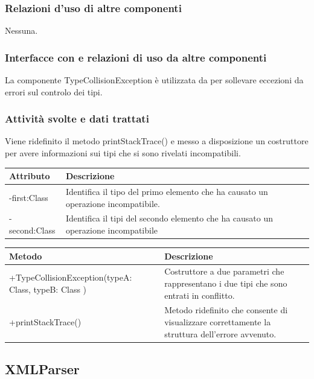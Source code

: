 \documentclass[11pt,titlepage,a4paper]{report}
\begin{document}
\subsubsection{Relazioni d'uso di altre componenti}
Nessuna.
\subsubsection{Interfacce con e relazioni di uso da altre componenti}
La componente TypeCollisionException \`e utilizzata da \brp per sollevare eccezioni da errori sul controlo dei tipi.
\subsubsection{Attivit\`a svolte e dati trattati}
Viene ridefinito il metodo printStackTrace() e messo a disposizione un costruttore per avere informazioni sui tipi che si sono rivelati incompatibili.
\begin{center}
\begin{tabular}{||p{6cm}||p{6cm}||} \hline
\hline
Attributo & Descrizione \\  \hline
-first:Class & Identifica il tipo del primo elemento che ha causato un operazione incompatibile. \\ \hline
-second:Class & Identifica il tipi del secondo elemento che ha causato un operazione incompatibile \\ \hline
\end{tabular}
\end{center}
\begin{center}
\begin{tabular}{||p{6cm}||p{6cm}||} \hline
\hline
Metodo & Descrizione \\  \hline
+TypeCollisionException(typeA: Class, typeB: Class ) & Costruttore a due parametri che rappresentano i due tipi che sono entrati in conflitto.\\ \hline
+printStackTrace() & Metodo ridefinito che consente di visualizzare correttamente la struttura dell'errore avvenuto.\\ \hline
\end{tabular}
\end{center}

\subsection{XMLParser}%
\end{document}
